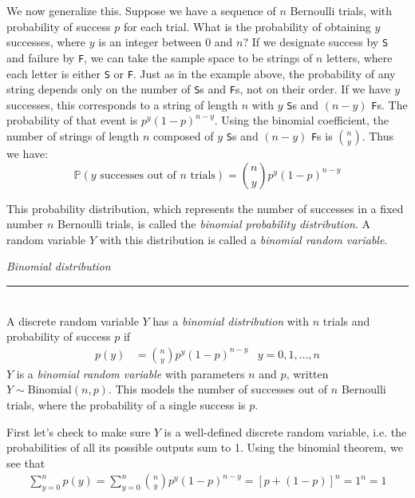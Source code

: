 \documentclass[12pt]{article}
\theoremstyle{definition}
\theoremstyle{remark}
\def\P{{\mathbb P}}
\begin{document}
We now generalize this. Suppose we have a sequence of $n$ Bernoulli trials, with probability of success $p$ for each trial. What is the probability of obtaining $y$ successes, where $y$ is an integer between 0 and $n$? If we designate success by \texttt{S} and failure by \texttt{F}, we can take the sample space to be strings of $n$ letters, where each letter is either \texttt{S} or \texttt{F}. Just as in the example above, the probability of any string depends only on the number of \texttt{S}s and \texttt{F}s, not on their order. If we have $y$ successes, this corresponds to a string of length $n$ with $y$ \texttt{S}s and $(n-y)$ \texttt{F}s. The probability of that event is $p^y(1-p)^{n-y}$. Using the binomial coefficient, the number of strings of length $n$ composed of $y$ \texttt{S}s and $(n-y)$ \texttt{F}s is $\binom{n}{y}$. Thus we have:
\[
\P(\text{$y$ successes out of $n$ trials})= \binom{n}{y} p^y (1-p)^{n-y}
\]

This probability distribution, which represents the number of successes in a fixed number $n$ Bernoulli trials, is called the \emph{binomial probability distribution}. A random variable $Y$ with this distribution is called a \emph{binomial random variable}.

\begin{framed}
  \emph{Binomial distribution}\\
  \rule{\dimexpr{}\fboxrule}{.1pt} \\
A discrete random variable $Y$ has a \emph{binomial distribution} with $n$ trials and probability of success $p$ if
\begin{align*}
p(y) &= \binom{n}{y} p^y (1-p)^{n-y} & y = 0, 1, \dots, n
\end{align*}
$Y$ is a \emph{binomial random variable} with parameters $n$ and $p$, written $Y \sim \text{Binomial}(n, p)$. This models the number of successes out of $n$ Bernoulli trials, where the probability of a single success is $p$.
\end{framed}

First let's check to make sure $Y$ is a well-defined discrete random variable, i.e. the probabilities of all its possible outputs sum to 1. Using the binomial theorem, we see that
\begin{align*}
\sum_{y=0}^n p(y) = \sum_{y=0}^n \binom{n}{y} p^y (1-p)^{n-y} = \left[p + (1 - p)\right]^n = 1^n = 1
\end{align*}
\end{document}
